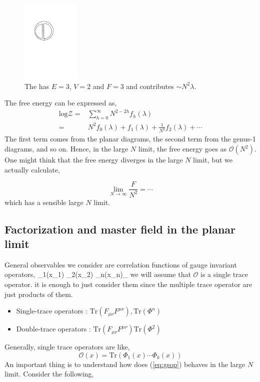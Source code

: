 \begin{figure}
\begin{center}\includegraphics[width=0.25\textwidth]{./Figures/DL4}\end{center}
\caption{\label{fig:dl99}The has $E=3$, $V=2$ and $F=3$ and contributes $\sim N^2 \lambda $.}
\end{figure}
The free energy can be expressed as, 
\begin{align}
  \label{eq:logZ}
   \text{log} \mathscr{Z} =&\sum_{h=0}^{\infty} N^{2-2h} f_{h}(\lambda) \\ 
   				    =& N^{2} f_{0}(\lambda) + f_{1}(\lambda) + \frac{1}{N^2} f_{2}(\lambda) + \cdots
\end{align}
The first term comes from the planar diagrams, the second term from the genus-1 diagrams, and so on.
Hence, in the large $N$ limit, the free energy goes as $\mathscr{O}(N^2)$. 
One might think that the free energy diverges in the large $N$ limit, but we actually calculate, 

\[ \displaystyle\lim_{N \to \infty} \frac{F}{N^2} = \cdots  \] 
which has a sensible large $N$ limit. 

\subsection{Factorization and master field in the planar limit}
General observables we consider are correlation functions of gauge invariant operators, 
\beq
 \label{eq:gsop}
\langle {}_{1}(x_{1}) _{2}(x_{2}) \cdots {}_{n}(x_{n})\rangle_{}
\eeq 
we will assume that $\mathcal{O}$ is a single trace operator. it is enough to just consider them since the multiple trace operator are just products of them. 
\begin{itemize}
\item Single-trace operators : $\mathrm{Tr}(F_{\mu\nu}F^{\mu\nu}) , \mathrm{Tr}(\Phi^n)$ 
\item Double-trace operators : $\mathrm{Tr}(F_{\mu\nu}F^{\mu\nu})\mathrm{Tr}(\Phi^2)$ 
\end{itemize}
Generally, single trace operators are like, 
\begin{equation}
 \mathcal{O}(x)  = \mathrm{Tr} (\Phi_{1}(x) \cdots \Phi_{k}(x)) 
 \end{equation}
An important thing is to understand how does (\ref{eq:gsop}) behaves in the large $N$ limit. Consider the following, 


